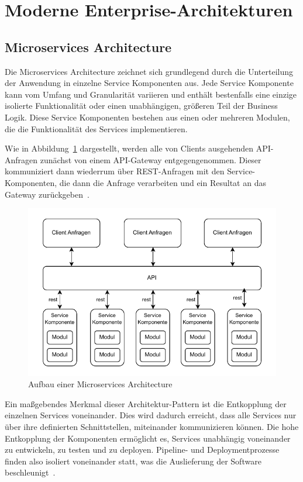 \documentclass[acmtog]{acmart}
\begin{document}
\section{Moderne Enterprise-Architekturen}

\subsection{Microservices Architecture}\label{subsec:microservices}
Die Microservices Architecture zeichnet sich grundlegend durch die Unterteilung der Anwendung in einzelne Service Komponenten aus.
Jede Service Komponente kann vom Umfang und Granularität variieren und enthält bestenfalls eine einzige isolierte Funktionalität
oder einen unabhängigen, größeren Teil der Business Logik.
Diese Service Komponenten bestehen aus einen oder mehreren Modulen, die die Funktionalität des Services implementieren.

Wie in Abbildung~\ref{fig:microservices} dargestellt, werden alle von Clients ausgehenden API-Anfragen zunächst von einem API-Gateway entgegengenommen.
Dieser kommuniziert dann wiederrum über REST-Anfragen mit den Service-Komponenten, die dann die Anfrage verarbeiten und ein Resultat an das Gateway zurückgeben~\cite[30]{architecturePatterns}.

\begin{figure}[!h]
  \centering
  \includegraphics[width=\linewidth]{images/microservices/microservices}
  \caption{Aufbau einer Microservices Architecture}
  \label{fig:microservices}
\end{figure}

Ein maßgebendes Merkmal dieser Architektur-Pattern ist die Entkopplung der einzelnen Services voneinander.
Dies wird dadurch erreicht, dass alle Services nur über ihre definierten Schnittstellen, miteinander kommunizieren können.
Die hohe Entkopplung der Komponenten ermöglicht es, Services unabhängig voneinander zu entwickeln, zu testen und zu deployen.
Pipeline- und Deploymentprozesse finden also isoliert voneinander statt, was die Auslieferung der Software beschleunigt~\cite[27]{architecturePatterns}.
\end{document}
